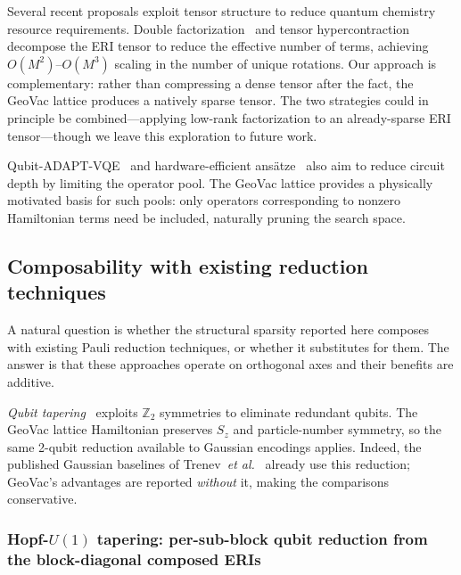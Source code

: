 \documentclass[aps,pra,twocolumn,superscriptaddress,longbibliography]{revtex4-2}
\begin{document}
Several recent proposals exploit tensor structure to reduce quantum
chemistry resource requirements.  Double factorization~\cite{motta2021}
and tensor hypercontraction~\cite{lee2021} decompose the ERI tensor to
reduce the effective number of terms, achieving $O(M^2)$--$O(M^3)$ scaling
in the number of unique rotations.  Our approach is complementary: rather
than compressing a dense tensor after the fact, the GeoVac lattice
produces a natively sparse tensor.  The two strategies could in principle
be combined---applying low-rank factorization to an already-sparse ERI
tensor---though we leave this exploration to future work.

Qubit-ADAPT-VQE~\cite{tang2021} and hardware-efficient
ans\"atze~\cite{kandala2017} also aim to reduce circuit depth by limiting
the operator pool.  The GeoVac lattice provides a physically motivated
basis for such pools: only operators corresponding to nonzero Hamiltonian
terms need be included, naturally pruning the search space.

\subsection{Composability with existing reduction techniques}
\label{sec:composability}

A natural question is whether the structural sparsity reported here
composes with existing Pauli reduction techniques, or whether it
substitutes for them.  The answer is that these approaches operate on
orthogonal axes and their benefits are additive.

\emph{Qubit tapering}~\cite{bravyi2017} exploits $\mathbb{Z}_2$
symmetries to eliminate redundant qubits.  The GeoVac lattice
Hamiltonian preserves $S_z$ and particle-number symmetry, so the
same 2-qubit reduction available to Gaussian encodings applies.
Indeed, the published Gaussian baselines of
Trenev~\textit{et al.}~\cite{trenev2025} already use this reduction; GeoVac's
advantages are reported \emph{without} it, making the comparisons
conservative.

\subsubsection{Hopf-$U(1)$ tapering: per-sub-block qubit reduction
from the block-diagonal composed ERIs}
\label{sec:hopf_tapering}
\end{document}
